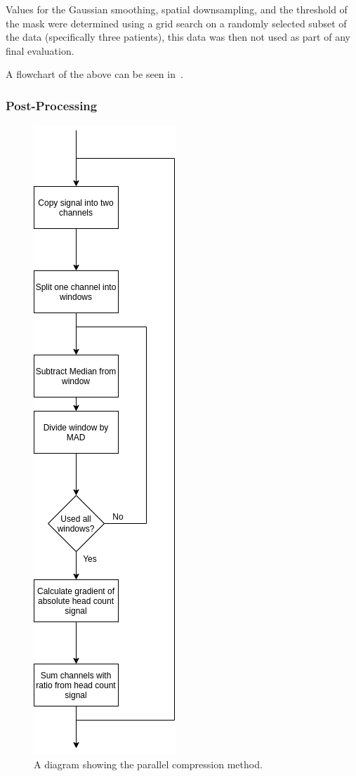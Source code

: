                 Values for the Gaussian smoothing, spatial downsampling, and the threshold of the mask were determined using a grid search on a randomly selected subset of the data (specifically three patients), this data was then not used as part of any final evaluation.

                A flowchart of the above can be seen in~.
            
            \subsubsection{Post-Processing} \label{sec:pca_data_driven_surrogate_signal_extraction_methods_for_dynamic_pet_evaluation_post_processing}
                \begin{figure}
                    \centering
                    
                    \includegraphics[width=0.3\linewidth]{figures/data_driven_surrogate_signal_extraction_methods_1_parallel_compression.png}
                    
                    \captionsetup{singlelinecheck=false}
                    \caption{
                        A diagram showing the parallel compression method.
                    }
                    \label{fig:pca_data_driven_surrogate_signal_extraction_methods_for_dynamic_pet_evaluation_post_processing_parallel_compression}
                \end{figure}
                
